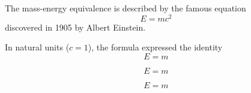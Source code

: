 \documentclass[12pt, letterpaper]{article}
\begin{document}
    The mass-energy equivalence is described by the famous equation \[ E = mc^2 \] discovered in 1905 by Albert Einstein.

    In natural units ($c = 1$), the formula expressed the identity \begin{equation} E = m \end{equation}

    \begin{displaymath} E = m \end{displaymath}

    \begin{equation} E = m \end{equation}
\end{document}
